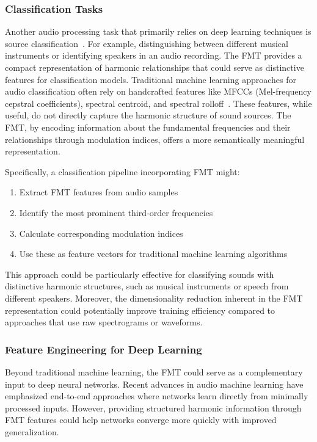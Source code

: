 \documentclass[11pt,twoside]{report}
\numberwithin{thm}{section}
\numberwithin{equation}{section}
\begin{document}
\subsubsection{Classification Tasks}
Another audio processing task that primarily relies on deep learning techniques is source classification~\cite{5678725}. For example, distinguishing between different musical instruments or identifying speakers in an audio recording. The FMT provides a compact representation of harmonic relationships that could serve as distinctive features for classification models.
Traditional machine learning approaches for audio classification often rely on handcrafted features like MFCCs (Mel-frequency cepstral coefficients), spectral centroid, and spectral rolloff~\cite{labelstudio_2022}. These features, while useful, do not directly capture the harmonic structure of sound sources. The FMT, by encoding information about the fundamental frequencies and their relationships through modulation indices, offers a more semantically meaningful representation.

Specifically, a classification pipeline incorporating FMT might:
\begin{enumerate}
    \item Extract FMT features from audio samples
    \item Identify the most prominent third-order frequencies
    \item Calculate corresponding modulation indices
    \item Use these as feature vectors for traditional machine learning algorithms
\end{enumerate}
This approach could be particularly effective for classifying sounds with distinctive harmonic structures, such as musical instruments or speech from different speakers. Moreover, the dimensionality reduction inherent in the FMT representation could potentially improve training efficiency compared to approaches that use raw spectrograms or waveforms.
\subsubsection{Feature Engineering for Deep Learning}
Beyond traditional machine learning, the FMT could serve as a complementary input to deep neural networks. Recent advances in audio machine learning have emphasized end-to-end approaches where networks learn directly from minimally processed inputs. However, providing structured harmonic information through FMT features could help networks converge more quickly with improved generalization.
\end{document}
